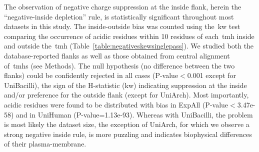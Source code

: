 The observation of negative charge suppression at the inside flank, herein the ``negative-inside depletion'' rule, is statistically significant throughout most datasets in this study.
The inside-outside bias was counted using the~\gls{kw} test comparing the occurrence of acidic residues within 10 residues of each~\gls{tmh} inside and outside the~\gls{tmh} (Table~\ref{table:negativeskewsinglepass}).
We studied both the database-reported flanks as well as those obtained from central alignment of~\gls{tmh}s (see Methods).
The null hypothesis (no difference between the two flanks) could be confidently rejected in all cases (P-value$<$0.001 except for UniBacilli), the sign of the H-statistic (\gls{kw}) indicating suppression at the inside and/or preference for the outside flank (except for UniArch).
Most importantly, acidic residues were found to be distributed with bias in ExpAll (P-value$<$3.47e-58) and in UniHuman (P-value=1.13e-93).
Whereas with UniBacilli, the problem is most likely the dataset size, the exception of UniArch, for which we observe a strong negative inside rule, is more puzzling and indicates biophysical differences of their plasma-membrane.

